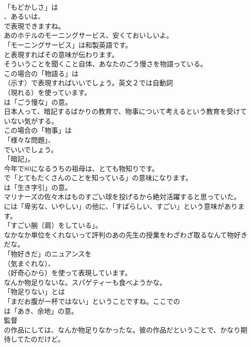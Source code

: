 \documentclass[8pt]{extreport}
\begin{document}
\begin{CJK}{UTF8}{min}
\\	「もどかしさ」は
\\	、あるいは、
\\	で表現できますね。	
\\	あのホテルのモーニングサービス、安くておいしいよ。 
\\	「モーニングサービス」は和製英語です。
\\	と表現すればその意味が伝わります。	
\\	そういうことを聞くこと自体、あなたのごう慢さを物語っている。 
\\	この場合の「物語る」は 
\\	（示す）で表現すればいいでしょう。英文２では自動詞 
\\	（現れる）を使っています。
\\	は「ごう慢な」の意。	
\\	日本人って、暗記するばかりの教育で、物事について考えるという教育を受けていない気がする。 
\\	この場合の「物事」は
\\	「様々な問題」、
\\	でいいでしょう。
\\	「暗記」。	
\\	今年で80になるうちの祖母は、とても物知りです。 
\\	で「とてもたくさんのことを知っている」の意味になります。
\\	は「生き字引」の意。	
\\	マリナーズの佐々木はものすごい球を投げるから絶対活躍すると思っていた。 
\\	には「卑劣な、いやしい」の他に、「すばらしい、すごい」という意味があります。
\\	「すごい腕〔肩）をしている」。	
\\	なかなか単位をくれないって評判のあの先生の授業をわざわざ取るなんて物好きだな。 
\\	「物好きだ」のニュアンスを 
\\	（気まぐれな）、
\\	（好奇心から）を使って表現しています。	
\\	なんか物足りないな。スパゲティーも食べようかな。 
\\	「物足りない」とは
\\	「まだお腹が一杯ではない」ということですね。ここでの
\\	は「あき、余地」の意。	
\\	監督
\\	の作品にしては、なんか物足りなかったな。彼の作品だということで、かなり期待してたのだけど。 

\end{CJK}
\end{document}
